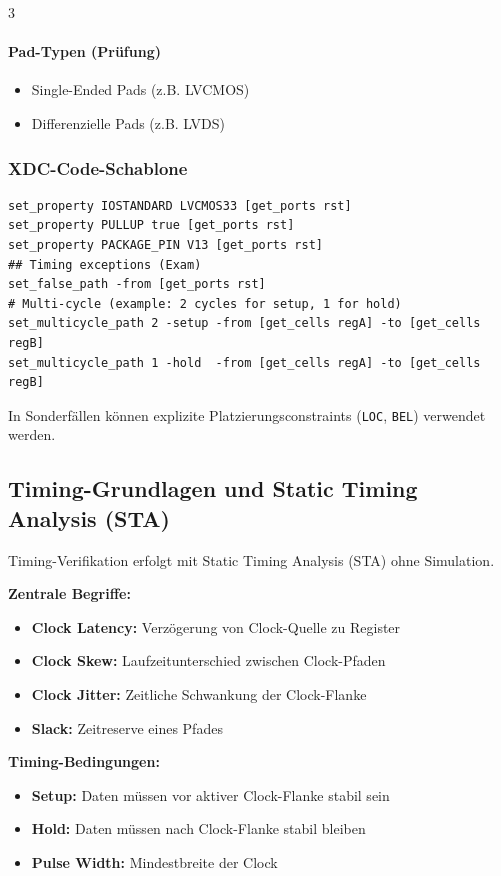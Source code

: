 \documentclass[10pt,a4paper]{article}
\newcommand{\hilite}[1]{\colorbox{yellow!25}{#1}}
\begin{document}
\begin{multicols}{3}
\paragraph{Pad-Typen (Prüfung)}
\begin{itemize}
  \item Single-Ended Pads (z.B. LVCMOS)
  \item Differenzielle Pads (z.B. LVDS)
\end{itemize}


\subsubsection*{XDC-Code-Schablone}
\begin{lstlisting}[style=xdc,emph={set_property,get_ports,PACKAGE_PIN,IOSTANDARD,PULLUP},emphstyle=\bfseries\color{codeemph}]
set_property IOSTANDARD LVCMOS33 [get_ports rst]
set_property PULLUP true [get_ports rst]
set_property PACKAGE_PIN V13 [get_ports rst]
## Timing exceptions (Exam)
set_false_path -from [get_ports rst]
# Multi-cycle (example: 2 cycles for setup, 1 for hold)
set_multicycle_path 2 -setup -from [get_cells regA] -to [get_cells regB]
set_multicycle_path 1 -hold  -from [get_cells regA] -to [get_cells regB]
\end{lstlisting}

In Sonderfällen können explizite Platzierungsconstraints (\texttt{LOC}, \texttt{BEL}) verwendet werden.

\subsection{Timing-Grundlagen und Static Timing Analysis (STA)}

Timing-Verifikation erfolgt mit \hilite{Static Timing Analysis (STA)} ohne Simulation.

\textbf{Zentrale Begriffe:}
\begin{itemize}
  \item \textbf{Clock Latency:} Verzögerung von Clock-Quelle zu Register
  \item \textbf{Clock Skew:} Laufzeitunterschied zwischen Clock-Pfaden
  \item \textbf{Clock Jitter:} Zeitliche Schwankung der Clock-Flanke
  \item \textbf{Slack:} Zeitreserve eines Pfades
\end{itemize}

\textbf{Timing-Bedingungen:}
\begin{itemize}
  \item \textbf{Setup:} Daten müssen vor aktiver Clock-Flanke stabil sein
  \item \textbf{Hold:} Daten müssen nach Clock-Flanke stabil bleiben
  \item \textbf{Pulse Width:} Mindestbreite der Clock
\end{itemize}


\end{multicols}
\end{document}
